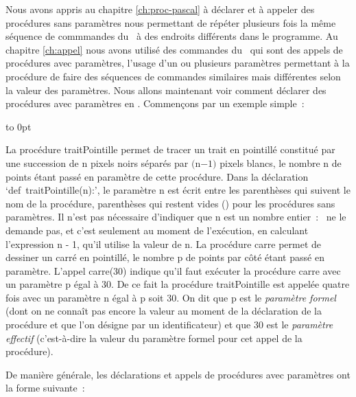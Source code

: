 Nous avons appris au chapitre \ref{ch:proc-pascal} à déclarer et à appeler des procédures sans paramètres
nous permettant de répéter plusieurs fois la même séquence de commmandes du
\robot\ à des endroits différents dans le programme. Au chapitre \ref{ch:appel} nous avons
utilisé des commandes du \robot\ qui sont des appels de procédures avec paramètres,
l'usage d'un ou plusieurs paramètres per\-met\-tant à la procédure de faire des séquences
de commandes similaires mais différentes selon la valeur des paramètres. Nous allons maintenant
voir comment déclarer des procédures avec paramètres en \python. Commençons
par un exemple simple~:

\bigskip

 {\raggedright 
 {}\hfill\vbox to 0pt{\vspace*{\baselineskip}\vspace*{3cm}
 }\hspace*{30mm}%
 \label{prog:CarrePointille}
 
 }
La procédure {\idt traitPointille} permet de tracer un trait en pointillé cons\-ti\-tué par une succession de
{\idt n} pixels noirs séparés par $(${\idt n}$ - 1)$ pixels blancs, le nom\-bre {\idt n} de points étant
passé en paramètre de cette procédure. Dans la déclaration `{\mcl def}\ {\idt traitPointille(n):}',
le paramètre {\idt n} est écrit entre les parenthèses qui suivent le nom de la procédure,
parenthèses qui restent vides {\idt ()} pour les procédures sans paramètres. Il n'est pas nécessaire d'indiquer que {\idt n} est
un nombre entier~: \python\ ne le demande pas, et c'est seulement au moment de l'exécution,
en calculant l'expression {\idt n - 1}, qu'il utilise la valeur de {\idt n}.
La procédure {\idt carre} permet de dessiner un carré
en pointillé, le nombre {\idt p} de points par côté étant passé en paramètre. L'appel {\idt carre(30)}
indique qu'il faut exécuter la procédure {\idt carre} avec un paramètre {\idt p} égal à 30. De ce fait la
procédure {\idt traitPointille} est appelée quatre fois avec un paramètre {\idt n} égal à {\idt p} soit
30. On dit que {\idt p} est le {\em paramètre formel}  (dont on ne connaît pas encore la valeur
au moment de la déclaration de la procédure et que l'on désigne par un identificateur) et que 
30 est le {\em paramètre effectif} (c'est-à-dire
la valeur du paramètre formel pour cet appel de la procédure).

De manière générale, les déclarations et appels de procédures avec pa\-ra\-mè\-tres ont  la forme
suivante~:

